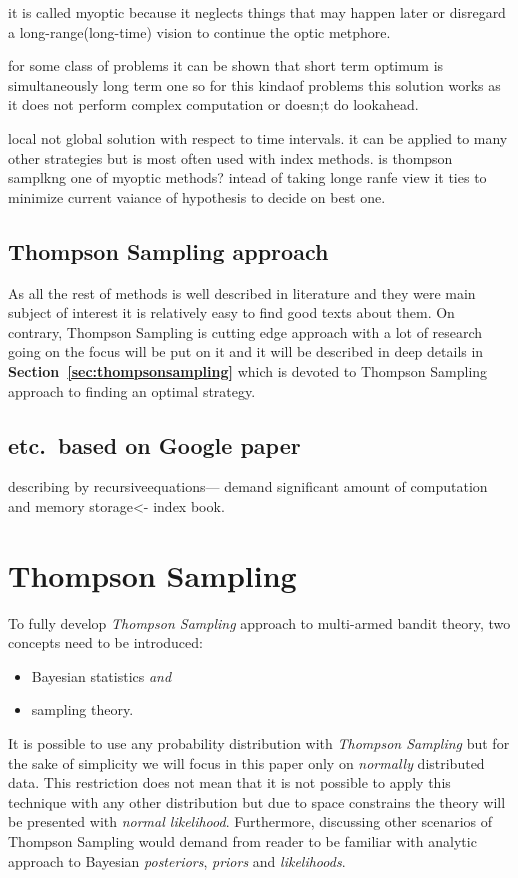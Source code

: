 \documentclass[12pt, a4paper, pdflatex, leqno]{report}
\begin{document}
it is called myoptic because it neglects things that may happen later or disregard a long-range(long-time) vision to continue the optic metphore.

for some class of problems it can be shown that short term optimum is simultaneously long term one so for this kindaof problems this solution works as it does not perform complex computation or doesn;t do lookahead.

local not global solution with respect to time intervals.
it can be applied to many other strategies but is most often used with index methods.
is thompson samplkng one of myoptic methods? intead of taking longe ranfe view it ties to minimize current vaiance of hypothesis to decide on best one.

\subsection{Thompson Sampling approach}
As all the rest of methods is well described in literature and they were main subject of interest it is relatively easy to find good texts about them. On contrary, Thompson Sampling is cutting edge approach with a lot of research going on the focus will be put on it and it will be described in deep details in  \textbf{Section~\ref{sec:thompsonsampling}} which is devoted to Thompson Sampling approach to finding an optimal strategy.

\subsection{etc.\ based on Google paper}

describing by recursiveequations--- demand significant amount of computation and memory storage<- index book.


\section{Thompson Sampling\label{sec:thompsonsampling}}
To fully develop \emph{Thompson Sampling} approach to multi-armed bandit theory, two concepts need to be introduced:
\begin{itemize}
\item Bayesian statistics \emph{and}
\item sampling theory.
\end{itemize}
It is possible to use any probability distribution with \emph{Thompson Sampling} but for the sake of simplicity we will focus in this paper only on \emph{normally} distributed data. This restriction does not mean that it is not possible to apply this technique with any other distribution but due to space constrains the theory will be presented with \emph{normal likelihood}. Furthermore, discussing other scenarios of Thompson Sampling would demand from reader to be familiar with analytic approach to Bayesian \emph{posteriors}, \emph{priors} and \emph{likelihoods}.
\end{document}
